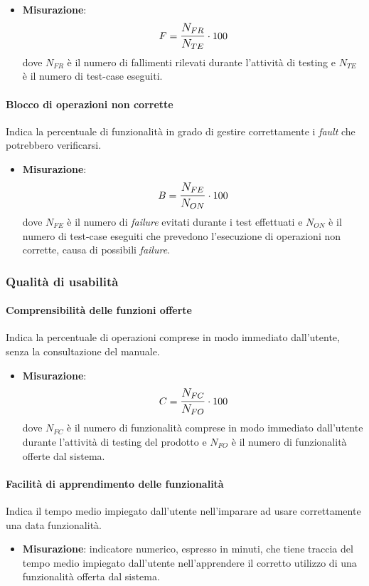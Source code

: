 \begin{itemize}
	\item \textbf{Misurazione}: 
		$$F=\mathlarger{\frac{N_{FR}}{N_{TE}}} \cdot 100$$
	dove $N_{FR}$ è il numero di fallimenti rilevati durante l'attività di testing e $N_{TE}$ è il numero di test-case eseguiti.
\end{itemize}

\paragraph{Blocco di operazioni non corrette}
Indica la percentuale di funzionalità in grado di gestire correttamente i \textit{fault} che potrebbero verificarsi.
\begin{itemize}
	\item \textbf{Misurazione}: 
		$$B=\mathlarger{\frac{N_{FE}}{N_{ON}}} \cdot 100$$
	dove $N_{FE}$ è il numero di \textit{failure} evitati durante i test effettuati e $N_{ON}$ è il numero di test-case eseguiti che prevedono l'esecuzione di operazioni non corrette, causa di possibili \textit{failure}.
\end{itemize}

\subsubsection{Qualità di usabilità}
\paragraph{Comprensibilità delle funzioni offerte}
Indica la percentuale di operazioni comprese in modo immediato dall'utente, senza la consultazione del manuale.
\begin{itemize}
	\item \textbf{Misurazione}: 
		$$C=\mathlarger{\frac{N_{FC}}{N_{FO}}} \cdot 100$$
	dove $N_{FC}$ è il numero di funzionalità comprese in modo immediato dall'utente durante l'attività di testing del prodotto e $N_{FO}$ è il numero di funzionalità offerte dal sistema.
\end{itemize}

\paragraph{Facilità di apprendimento delle funzionalità}
Indica il tempo medio impiegato dall'utente nell'imparare ad usare correttamente una data funzionalità.
\begin{itemize}
	\item \textbf{Misurazione}: indicatore numerico, espresso in minuti, che tiene traccia del tempo medio impiegato dall'utente nell'apprendere il corretto utilizzo di una funzionalità offerta dal sistema.
\end{itemize}

